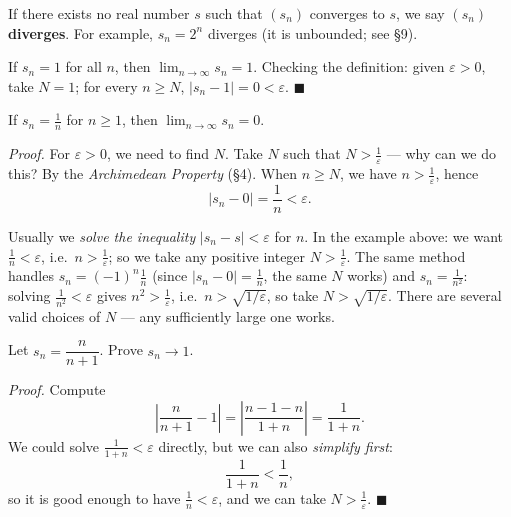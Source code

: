\documentclass[11pt]{report}
\begin{document}
\begin{defbox}[Divergence]
If there exists no real number $s$ such that $(s_n)$ converges to $s$, we say $(s_n)$ \textbf{diverges}. For example, $s_n = 2^n$ diverges (it is unbounded; see \S 9).
\end{defbox}

\begin{exbox}
If $s_n = 1$ for all $n$, then $\lim_{n\to\infty} s_n = 1$. Checking the definition: given $\varepsilon > 0$, take $N = 1$; for every $n \geq N$, $|s_n - 1| = 0 < \varepsilon$. \hfill $\blacksquare$
\end{exbox}

\begin{exbox}[$1/n \to 0$]
If $s_n = \tfrac1n$ for $n \geq 1$, then $\lim_{n\to\infty} s_n = 0$.

\emph{Proof.} For $\varepsilon > 0$, we need to find $N$. Take $N$ such that $N > \tfrac{1}{\varepsilon}$ --- why can we do this? By the \emph{Archimedean Property} (\S 4). When $n \geq N$, we have $n > \tfrac1\varepsilon$, hence
\[
|s_n - 0| = \frac1n < \varepsilon. \tag*{$\blacksquare$}
\]
\end{exbox}

\begin{rembox}
Usually we \emph{solve the inequality} $|s_n - s| < \varepsilon$ for $n$. In the example above: we want $\tfrac1n < \varepsilon$, i.e.\ $n > \tfrac1\varepsilon$; so we take any positive integer $N > \tfrac1\varepsilon$. The same method handles $s_n = (-1)^n \tfrac1n$ (since $|s_n - 0| = \tfrac1n$, the same $N$ works) and $s_n = \tfrac{1}{n^2}$: solving $\tfrac{1}{n^2} < \varepsilon$ gives $n^2 > \tfrac1\varepsilon$, i.e.\ $n > \sqrt{1/\varepsilon}$, so take $N > \sqrt{1/\varepsilon}$. There are several valid choices of $N$ --- any sufficiently large one works.
\end{rembox}

\begin{exbox}
Let $s_n = \dfrac{n}{n+1}$. Prove $s_n \to 1$.

\emph{Proof.} Compute
\[
\left| \frac{n}{n+1} - 1 \right| = \left| \frac{n - 1 - n}{1+n} \right| = \frac{1}{1+n}.
\]
We could solve $\tfrac{1}{1+n} < \varepsilon$ directly, but we can also \emph{simplify first}:
\[
\frac{1}{1+n} < \frac1n,
\]
so it is good enough to have $\tfrac1n < \varepsilon$, and we can take $N > \tfrac1\varepsilon$. \hfill $\blacksquare$
\end{exbox}
\end{document}
